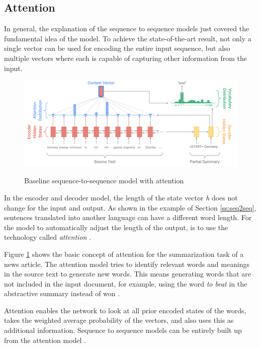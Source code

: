 \subsection{Attention}\label{ss:atten}
In general, the explanation of the sequence to sequence models just covered the fundamental idea of the model. To achieve the state-of-the-art result, not only a single vector can be used for encoding the entire input sequence, but also multiple vectors where each is capable of capturing other information from the input. 

\begin{figure}
	\begin{center}
		\includegraphics[width=6.5in]{photos/attenion}\\
		\caption{Baseline sequence-to-sequence model with attention \cite{see-etal-2017-get} }\label{attention1}
	\end{center}
\end{figure}

In the encoder and decoder model, the length of the state vector \textit{h} does not change for the input and output. As shown in the example of Section \ref{ss:seq2seq}, sentences translated into another language can have a different word length. For the model to automatically adjust the length of the output, is to use the technology called \textit{attention} \cite{attention} \cite{attention2}.

Figure \ref{attention1} shows the basic concept of attention for the summarization task of a news article.  The attention model tries to identify relevant words and meanings in the source text to generate new words. This means generating words that are not included in the input document, for example, using the word \textit{to beat} in the abstractive summary instead of won \cite{see-etal-2017-get}.

Attention enables the network to look at all prior encoded states of the words, takes the weighted average probability of the vectors, and also uses this as additional information. Sequence to sequence models can be entirely built up from the attention model \cite{attention2}. 

